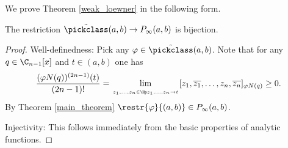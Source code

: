 We prove Theorem \ref{weak_loewner} in the following form.
\begin{lause}\label{better_weak_loewner}
	The restriction $\tilde{\pickclass}(a, b) \to P_{\infty}(a, b)$ is bijection.
\end{lause}
\begin{proof}
	Well-definedness: Pick any $\varphi \in \tilde{\pickclass}(a, b)$. Note that for any $q \in \C_{n - 1}[x]$ and $t \in (a, b)$ one has
	\begin{align*}
		\frac{(\varphi N(q))^{(2 n - 1)}(t)}{(2 n - 1)!} = \lim_{\atop{z_{1}, \ldots, z_{n} \in \Hp}{z_{1}, \ldots, z_{n} \to t}} [z_{1}, \overline{z_{1}}, \ldots, z_{n}, \overline{z_{n}}]_{\varphi N(q)} \geq 0.
	\end{align*}
	By Theorem \ref{main_theorem} $\restr{\varphi}{(a, b)} \in P_{\infty}(a, b)$.

	Injectivity: This follows immediately from the basic properties of analytic functions.


\end{proof}
